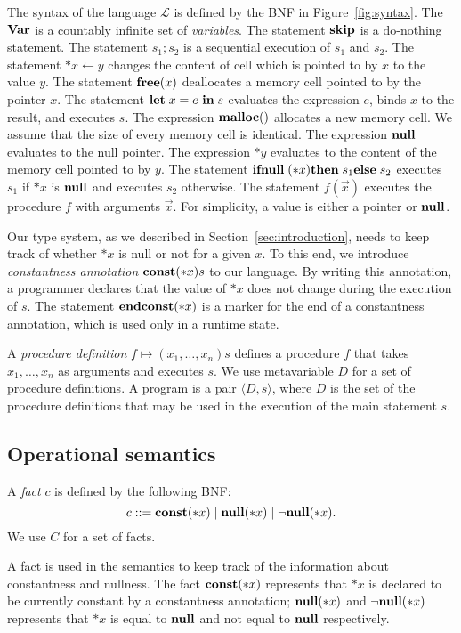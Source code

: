 
The syntax of the language \(\mathcal{L}\) is defined by the BNF in
Figure~\ref{fig:syntax}.  The \(\mathbf{Var}\) is a countably infinite set of
\emph{variables}. The statement \(\mathbf{skip}\) is a do-nothing statement.
The statement \(s_1;s_2\) is a sequential execution of \(s_1\) and
\(s_2\). The statement \(*x \leftarrow y\) changes the content of cell
which is pointed to by \(x\) to the value \(y\). The statement
\(\mathbf{free}(x)\) deallocates a memory cell pointed to by the pointer
\(x\). The statement \(\mathbf{let}\; x = e\ \mathbf{in}\; s\) evaluates the expression
\(e\), binds \(x\) to the result, and executes \(s\).  The expression
\(\mathbf{malloc}()\) allocates a new memory cell.  We assume that the size of
every memory cell is identical.  The expression \(\mathbf{null}\) evaluates to
the null pointer.  The expression $*y$ evaluates to the content of the
memory cell pointed to by \(y\).  The statement \(\mathbf{ifnull}\;(*x) \mathbf{then}\; s_1
\mathbf{else}\; s_2\) executes \(s_1\) if \(*x\) is \(\mathbf{null}\) and executes \(s_2\)
otherwise. The statement \(f(\vec{x})\) executes the procedure \(f\)
with arguments \(\vec{x}\).  For simplicity, a value is either a pointer
or $\mathbf{null}$.

Our type system, as we described in Section~\ref{sec:introduction},
needs to keep track of whether $*x$ is null or not for a given $x$.  To
this end, we introduce \emph{constantness annotation} \(\mathbf{const}(*x) s\)
to our language.  By writing this annotation, a programmer declares that
the value of $*x$ does not change during the execution of $s$.  The
statement \(\mathbf{endconst}(*x)\) is a marker for the end of a constantness
annotation, which is used only in a runtime state.

A \emph{procedure definition} $f \mapsto (x_1,\dots,x_n)s$ defines a
procedure $f$ that takes $x_1,\dots,x_n$ as arguments and executes $s$.
We use metavariable \(D\) for a set of procedure definitions.  A program
is a pair \(\langle D, s \rangle \), where \(D\) is the set of the
procedure definitions that may be used in the execution of the main
statement $s$.

\subsection{Operational semantics}
\label{sec:languageSemantics}

\begin{myDef}
 A \emph{fact} $c$ is defined by the following BNF:
 \[
 c ::= \mathbf{const}(*x) \mid \mathbf{null}(*x) \mid \neg\mathbf{null}(*x).
 \]
 We use $C$ for a set of facts.
\end{myDef}
A fact is used in the semantics to keep track of the information about
constantness and nullness.  The fact \(\mathbf{const}(*x)\) represents that $*x$
is declared to be currently constant by a constantness annotation;
\(\mathbf{null}(*x)\) and \(\neg\mathbf{null}(*x)\) represents that $*x$ is equal to $\mathbf{null}$ and
not equal to $\mathbf{null}$ respectively.

